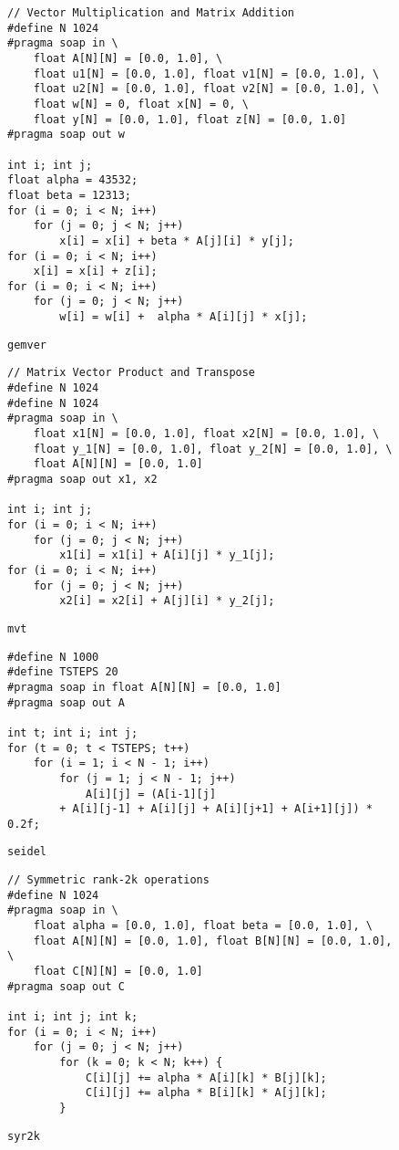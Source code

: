 \begin{figure}[ht]
\begin{lstlisting}
// Vector Multiplication and Matrix Addition
#define N 1024
#pragma soap in \
    float A[N][N] = [0.0, 1.0], \
    float u1[N] = [0.0, 1.0], float v1[N] = [0.0, 1.0], \
    float u2[N] = [0.0, 1.0], float v2[N] = [0.0, 1.0], \
    float w[N] = 0, float x[N] = 0, \
    float y[N] = [0.0, 1.0], float z[N] = [0.0, 1.0]
#pragma soap out w

int i; int j;
float alpha = 43532;
float beta = 12313;
for (i = 0; i < N; i++)
    for (j = 0; j < N; j++)
        x[i] = x[i] + beta * A[j][i] * y[j];
for (i = 0; i < N; i++)
    x[i] = x[i] + z[i];
for (i = 0; i < N; i++)
    for (j = 0; j < N; j++)
        w[i] = w[i] +  alpha * A[i][j] * x[j];
\end{lstlisting}
\caption{\texttt{gemver}}
\end{figure}


\begin{figure}[ht]
\begin{lstlisting}
// Matrix Vector Product and Transpose
#define N 1024
#define N 1024
#pragma soap in \
    float x1[N] = [0.0, 1.0], float x2[N] = [0.0, 1.0], \
    float y_1[N] = [0.0, 1.0], float y_2[N] = [0.0, 1.0], \
    float A[N][N] = [0.0, 1.0]
#pragma soap out x1, x2

int i; int j;
for (i = 0; i < N; i++)
    for (j = 0; j < N; j++)
        x1[i] = x1[i] + A[i][j] * y_1[j];
for (i = 0; i < N; i++)
    for (j = 0; j < N; j++)
        x2[i] = x2[i] + A[j][i] * y_2[j];
\end{lstlisting}
\caption{\texttt{mvt}}
\end{figure}


\begin{figure}[ht]
\begin{lstlisting}
#define N 1000
#define TSTEPS 20
#pragma soap in float A[N][N] = [0.0, 1.0]
#pragma soap out A

int t; int i; int j;
for (t = 0; t < TSTEPS; t++)
    for (i = 1; i < N - 1; i++)
        for (j = 1; j < N - 1; j++)
            A[i][j] = (A[i-1][j]
        + A[i][j-1] + A[i][j] + A[i][j+1] + A[i+1][j]) * 0.2f;
\end{lstlisting}
\caption{\texttt{seidel}}
\end{figure}


\begin{figure}[ht]
\begin{lstlisting}
// Symmetric rank-2k operations
#define N 1024
#pragma soap in \
    float alpha = [0.0, 1.0], float beta = [0.0, 1.0], \
    float A[N][N] = [0.0, 1.0], float B[N][N] = [0.0, 1.0], \
    float C[N][N] = [0.0, 1.0]
#pragma soap out C

int i; int j; int k;
for (i = 0; i < N; i++)
    for (j = 0; j < N; j++)
        for (k = 0; k < N; k++) {
            C[i][j] += alpha * A[i][k] * B[j][k];
            C[i][j] += alpha * B[i][k] * A[j][k];
        }
\end{lstlisting}
\caption{\texttt{syr2k}}
\end{figure}
